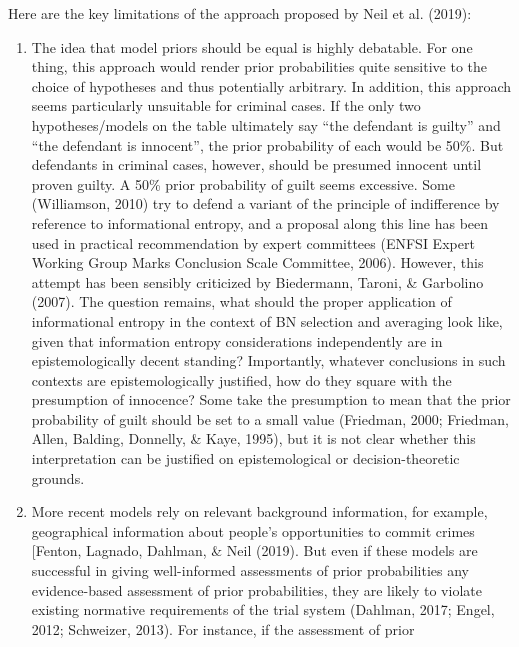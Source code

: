 \documentclass[11pt,dvipsnames,enabledeprecatedfontcommands]{scrartcl}
\begin{document}
\vspace{2mm}

Here are the key limitations of the approach proposed by Neil et al.
(2019):

\begin{enumerate}
\def\labelenumi{\Alph{enumi}.}
\setcounter{enumi}{4}
\item
  The idea that model priors should be equal is highly debatable. For
  one thing, this approach would render prior probabilities quite
  sensitive to the choice of hypotheses and thus potentially arbitrary.
  In addition, this approach seems particularly unsuitable for criminal
  cases. If the only two hypotheses/models on the table ultimately say
  ``the defendant is guilty'' and ``the defendant is innocent'', the
  prior probability of each would be 50\%. But defendants in criminal
  cases, however, should be presumed innocent until proven guilty. A
  50\% prior probability of guilt seems excessive. Some (Williamson,
  2010) try to defend a variant of the principle of indifference by
  reference to informational entropy, and a proposal along this line has
  been used in practical recommendation by expert committees (ENFSI
  Expert Working Group Marks Conclusion Scale Committee, 2006). However,
  this attempt has been sensibly criticized by Biedermann, Taroni, \&
  Garbolino (2007). The question remains, what should the proper
  application of informational entropy in the context of BN selection
  and averaging look like, given that information entropy considerations
  independently are in epistemologically decent standing? Importantly,
  whatever conclusions in such contexts are epistemologically justified,
  how do they square with the presumption of innocence? Some take the
  presumption to mean that the prior probability of guilt should be set
  to a small value (Friedman, 2000; Friedman, Allen, Balding, Donnelly,
  \& Kaye, 1995), but it is not clear whether this interpretation can be
  justified on epistemological or decision-theoretic grounds.
\item
  More recent models rely on relevant background information, for
  example, geographical information about people's opportunities to
  commit crimes {[}Fenton, Lagnado, Dahlman, \& Neil (2019). But even if
  these models are successful in giving well-informed assessments of
  prior probabilities any evidence-based assessment of prior
  probabilities, they are likely to violate existing normative
  requirements of the trial system (Dahlman, 2017; Engel, 2012;
  Schweizer, 2013). For instance, if the assessment of prior

\end{enumerate}
\end{document}
